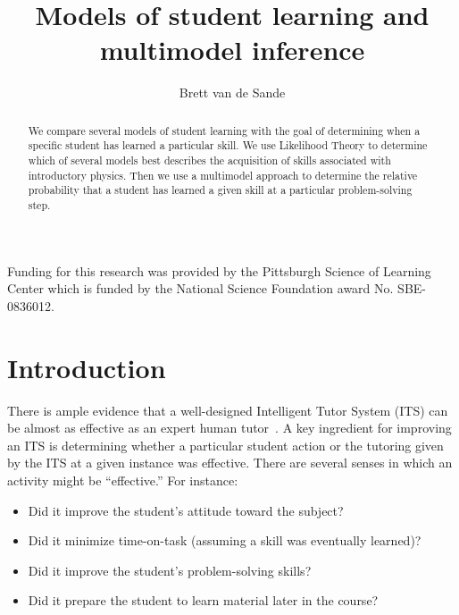 \documentclass{acmlarge-edm}
\begin{document}
\title{Models of student learning and multimodel inference}
\author{Brett van de Sande
}

%

\begin{abstract}
We compare several models of student learning with the goal of
determining when a specific student has learned a particular skill.
We use Likelihood Theory to determine which of several models best
describes the acquisition of skills associated with introductory
physics.  Then we use a multimodel approach to determine the relative
probability that a student has learned a given skill at a particular
problem-solving step.
\end{abstract}





\begin{bottomstuff}
Funding for this research was provided by the Pittsburgh Science of
Learning Center which is funded by the National Science Foundation
award No. SBE-0836012.
\end{bottomstuff}


\maketitle


\section{Introduction}


There is ample evidence that a well-designed Intelligent Tutor System
(ITS) can be almost as effective as an expert human
tutor~\cite{vanlehn_relative_2011}.  A key ingredient for improving an
ITS is determining whether a particular student action or the tutoring
given by the ITS at a given instance was effective.  There are several
senses in which an activity might be ``effective.''  For instance:
%
\begin{itemize}
\item Did it improve the student's attitude toward
the subject?  
\item Did it minimize time-on-task (assuming 
a skill was eventually learned)?  
\item Did it improve the student's 
problem-solving skills?  
\item Did it prepare the student to learn
material later in the course?
\end{itemize}
\end{document}
